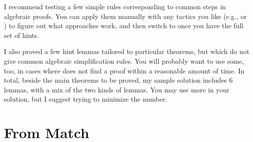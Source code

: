 \documentclass[12pt]{report}
\begin{document}
\begin{enumerate}
   I recommend testing a few simple rules corresponding to common steps in algebraic proofs.  You can apply them manually with any tactics you like (e.g.,  or ) to figure out what approaches work, and then switch to  once you have the full set of hints.


   I also proved a few hint lemmas tailored to particular theorems, but which do not give common algebraic simplification rules.  You will probably want to use some, too, in cases where  does not find a proof within a reasonable amount of time.  In total, beside the main theorems to be proved, my sample solution includes 6 lemmas, with a mix of the two kinds of lemmas.  You may use more in your solution, but I suggest trying to minimize the number.


\end{enumerate} 

\section{From Match}
\end{document}
